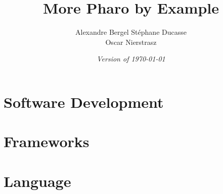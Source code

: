 \documentclass[a4paper,10pt,twoside]{book}
\begin{document}
\frontmatter
\setcounter{page}{1}
\pagestyle{headings}
\author{
	Alexandre Bergel\quad
	St\'ephane Ducasse\\[1ex]
	Oscar Nierstrasz\quad}
\title{\Huge\bf More Pharo by Example\\[1ex]}
\isodate
\date{\emph{Version of \today}}
\maketitle
\tableofcontents
\sloppy %
\mainmatter

\part{Software Development}

% 
% 
% 

\part{Frameworks}

% 



\part{Language}

% 






\printindex
\end{document}

